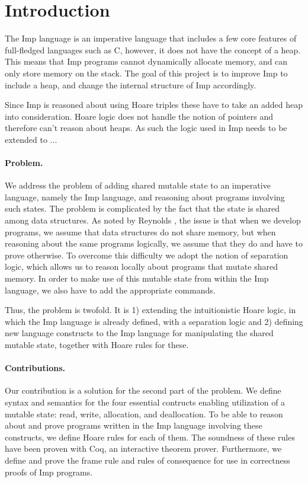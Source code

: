 \section{Introduction}
The Imp language is an imperative language that includes a few core features of full-fledged languages such as C, however, it does not have the concept of a heap. This means that Imp programs cannot dynamically allocate memory, and can only store memory on the stack. The goal of this project is to improve Imp to include a heap, and change the internal structure of Imp accordingly.

Since Imp is reasoned about using Hoare triples these have to take an added heap into consideration. Hoare logic does not handle the notion of pointers and therefore can't reason about heaps. As such the logic used in Imp needs to be extended to ...

\paragraph{Problem.}
We address the problem of adding shared mutable state to an imperative language, namely the Imp language, and reasoning about programs involving such states. The problem is complicated by the fact that the state is shared among data structures. As noted by Reynolds , the issue is that when we develop programs, we assume that data structures do not share memory, but when reasoning about the same programs logically, we assume that they do and have to prove otherwise. To overcome this difficulty we adopt the notion of separation logic, which allows us to reason locally about programs that mutate shared memory. In order to make use of this mutable state from within the Imp language, we also have to add the appropriate commands.

Thus, the problem is twofold. It is 1) extending the intuitionistic Hoare logic, in which the Imp language is already defined, with a separation logic and 2) defining new language constructs to the Imp language for manipulating the shared mutable state, together with Hoare rules for these.


\paragraph{Contributions.}
Our contribution is a solution for the second part of the problem. We define syntax and semantics for the four essential contructs enabling utilization of a mutable state: read, write, allocation, and deallocation. To be able to reason about and prove programs written in the Imp language involving these constructs, we define Hoare rules for each of them. The soundness of these rules have been proven with Coq, an interactive theorem prover. Furthermore, we define and prove the frame rule and rules of consequence for use in correctness proofs of Imp programs.

